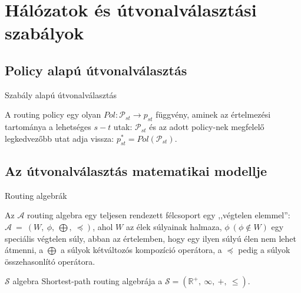 \section[Hálózatok]{Hálózatok és útvonalválasztási szabályok}
  \subsection{Policy alapú útvonalválasztás}
  \begin{frame}[<+->]{Szabály alapú útvonalválasztás}


    \begin{definition} 
      \justifying
      A routing policy egy olyan $Pol: \mathcal{P}_{st} \rightarrow p_{st}$ függvény, aminek az értelmezési tartománya a lehetséges $s - t$ utak: $\mathcal{P}_{st}$ és az adott policy-nek megfelelő legkedvezőbb utat adja vissza: $p_{st}^{*}=Pol(\mathcal{P}_{st})$.
    \end{definition}
  \end{frame}

  \subsection{Az útvonalválasztás matematikai modellje}
  \begin{frame}[<+->]{Routing algebrák}
    \begin{definition} 
      \justifying
      Az $\mathcal{A}$ routing algebra egy teljesen rendezett félcsoport egy ,,végtelen elemmel'': $\mathcal{A}~=~(W,~\phi,~\bigoplus,~\preceq)$, ahol $W$ az élek súlyainak halmaza, $\phi~(\phi \notin W)$ egy speciális végtelen súly, abban az értelemben, hogy egy ilyen súlyú élen nem lehet átmenni, a $\bigoplus$ a súlyok kétváltozós kompozíció operátora, a $\preceq$ pedig a súlyok összehasonlító operátora.
    \end{definition}

    \begin{exampleblock} {$\mathcal{S}$ algebra}
      Shortest-path routing algebrája a $\mathcal{S} = (\mathbb{R}^{+},~\infty,~+,~\leq)$.
    \end{exampleblock}
  \end{frame}

